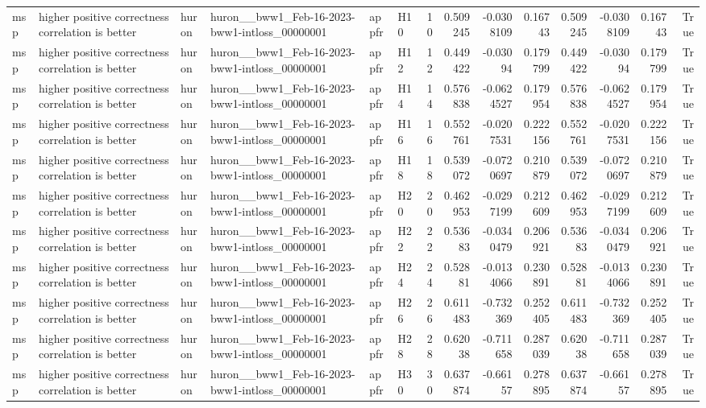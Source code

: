 \begin{longtable}{llllllrrrrrrrr}
msp & higher positive correctness correlation is better & huron & huron\_\_bww1\_Feb-16-2023-bww1-intloss\_00000001 & appfr & H10 & 10 & 0.509245 & -0.0308109 & 0.16743 & 0.509245 & -0.0308109 & 0.16743 & True \\
msp & higher positive correctness correlation is better & huron & huron\_\_bww1\_Feb-16-2023-bww1-intloss\_00000001 & appfr & H12 & 12 & 0.449422 & -0.03094 & 0.179799 & 0.449422 & -0.03094 & 0.179799 & True \\
msp & higher positive correctness correlation is better & huron & huron\_\_bww1\_Feb-16-2023-bww1-intloss\_00000001 & appfr & H14 & 14 & 0.576838 & -0.0624527 & 0.179954 & 0.576838 & -0.0624527 & 0.179954 & True \\
msp & higher positive correctness correlation is better & huron & huron\_\_bww1\_Feb-16-2023-bww1-intloss\_00000001 & appfr & H16 & 16 & 0.552761 & -0.0207531 & 0.222156 & 0.552761 & -0.0207531 & 0.222156 & True \\
msp & higher positive correctness correlation is better & huron & huron\_\_bww1\_Feb-16-2023-bww1-intloss\_00000001 & appfr & H18 & 18 & 0.539072 & -0.0720697 & 0.210879 & 0.539072 & -0.0720697 & 0.210879 & True \\
msp & higher positive correctness correlation is better & huron & huron\_\_bww1\_Feb-16-2023-bww1-intloss\_00000001 & appfr & H20 & 20 & 0.462953 & -0.0297199 & 0.212609 & 0.462953 & -0.0297199 & 0.212609 & True \\
msp & higher positive correctness correlation is better & huron & huron\_\_bww1\_Feb-16-2023-bww1-intloss\_00000001 & appfr & H22 & 22 & 0.53683 & -0.0340479 & 0.206921 & 0.53683 & -0.0340479 & 0.206921 & True \\
msp & higher positive correctness correlation is better & huron & huron\_\_bww1\_Feb-16-2023-bww1-intloss\_00000001 & appfr & H24 & 24 & 0.52881 & -0.0134066 & 0.230891 & 0.52881 & -0.0134066 & 0.230891 & True \\
msp & higher positive correctness correlation is better & huron & huron\_\_bww1\_Feb-16-2023-bww1-intloss\_00000001 & appfr & H26 & 26 & 0.611483 & -0.732369 & 0.252405 & 0.611483 & -0.732369 & 0.252405 & True \\
msp & higher positive correctness correlation is better & huron & huron\_\_bww1\_Feb-16-2023-bww1-intloss\_00000001 & appfr & H28 & 28 & 0.62038 & -0.711658 & 0.287039 & 0.62038 & -0.711658 & 0.287039 & True \\
msp & higher positive correctness correlation is better & huron & huron\_\_bww1\_Feb-16-2023-bww1-intloss\_00000001 & appfr & H30 & 30 & 0.637874 & -0.66157 & 0.278895 & 0.637874 & -0.66157 & 0.278895 & True \\

\end{longtable}
